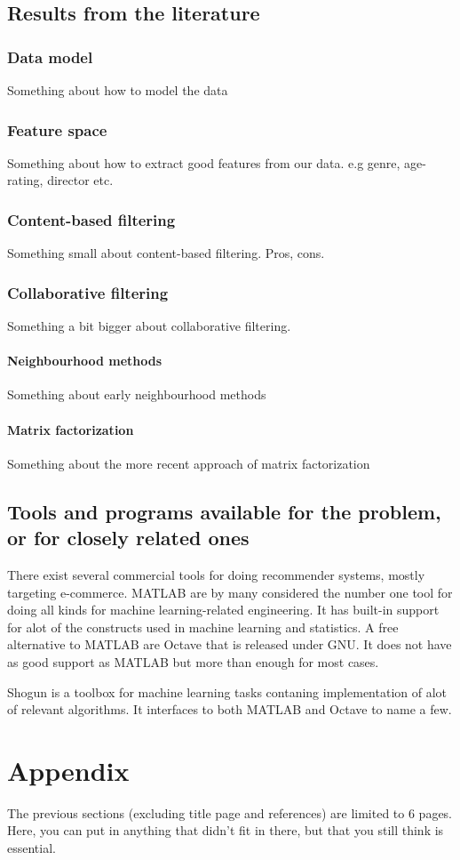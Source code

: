 \documentclass[a4paper,11pt]{report}
\begin{document}
\section{Results from the literature}
\label{sec:results}
\subsection{Data model}
Something about how to model the data

\subsection{Feature space}
Something about how to extract good features from our data. e.g genre, age-rating, director etc.

\subsection{Content-based filtering}
Something small about content-based filtering. Pros, cons.

\subsection{Collaborative filtering}
Something a bit bigger about collaborative filtering.
\subsubsection{Neighbourhood methods}
Something about early neighbourhood methods
\subsubsection{Matrix factorization}
Something about the more recent approach of matrix factorization

\section{Tools and programs available for the problem, or for closely related ones}
There exist several commercial tools for doing recommender systems, mostly targeting e-commerce. MATLAB\cite{matlab-ml} are by many considered
the number one tool for doing all kinds for machine learning-related engineering. It has built-in support for alot of the constructs used in 
machine learning and statistics. A free alternative to MATLAB are Octave\cite{octave} that is released under GNU. It does not have as good support
as MATLAB but more than enough for most cases.

Shogun\cite{shogun} is a toolbox for machine learning tasks contaning implementation of alot of relevant algorithms. It interfaces to both MATLAB
and Octave to name a few.

\chapter{Appendix}
The previous sections (excluding title page and references) are limited to 6 pages. Here, you can put in anything that didn't fit in there, but that you still think is essential.



\end{document}
